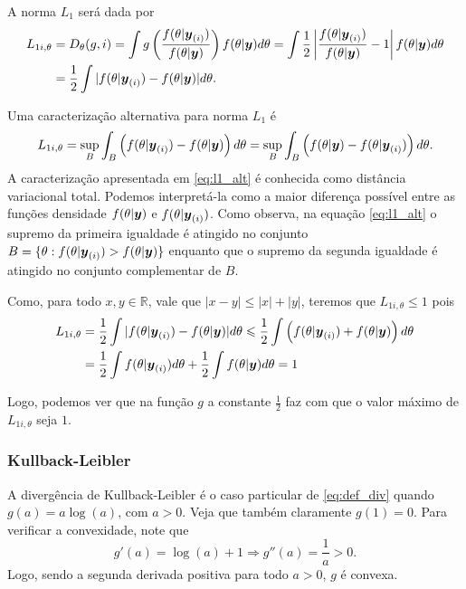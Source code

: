 A norma $L_1$ será dada por
\begin{equation}
\begin{split}
L_{1i,\theta} &= D_\theta(g,i)=\int g\left(\frac{f(\theta|{\boldsymbol{y}_{(i)}})}{f(\theta|{\boldsymbol{y}})}\right)f(\theta|{\boldsymbol{y}}) d\theta = \int \frac{1}{2}\left|\frac{f(\theta|{\boldsymbol{y}_{(i)}})}{f(\theta|{\boldsymbol{y}})}-1\right|f(\theta|{\boldsymbol{y}}) d\theta \\
{}& = \frac{1}{2} \int |f(\theta|{\boldsymbol{y}_{(i)}})-f(\theta|{\boldsymbol{y}})| d\theta.
\end{split}
\end{equation}

Uma caracterização alternativa para norma $L_1$ é
\begin{equation}\label{eq:l1_alt}
L_{1i,\theta} = \sup_B \int_B \left( f(\theta|{\boldsymbol{y}_{(i)}}) - f(\theta|{\boldsymbol{y}}) \right) d\theta = \sup_B \int_B \left( f(\theta|{\boldsymbol{y}}) - f(\theta|{\boldsymbol{y}_{(i)}}) \right) d\theta.
\end{equation}
A caracterização apresentada em \eqref{eq:l1_alt} é conhecida como distância variacional total. Podemos interpretá-la como a maior diferença possível entre as funções densidade $f(\theta|{\boldsymbol{y}})$ e $f(\theta|{\boldsymbol{y}_{(i)}})$. Como \citet{Weiss1996} observa, na equação \eqref{eq:l1_alt} o supremo da primeira igualdade é atingido no conjunto $B=\{\theta: f(\theta|{\boldsymbol{y}_{(i)}})>f(\theta|{\boldsymbol{y}})\}$ enquanto que o supremo da segunda igualdade é atingido no conjunto complementar de $B$.

Como, para todo $x,y\in \mathbb{R}$, vale que $|x-y|\leqslant |x|+|y|$, teremos que $L_{1i,\theta}\leqslant 1$ pois
\begin{equation}
\begin{split}
L_{1i,\theta} &= \frac{1}{2} \int |f(\theta|{\boldsymbol{y}_{(i)}})-f(\theta|{\boldsymbol{y}})| d\theta \leqslant \frac{1}{2} \int \left(f(\theta|{\boldsymbol{y}_{(i)}})+f(\theta|{\boldsymbol{y}})\right) d\theta \\
{}& = \frac{1}{2} \int f(\theta|{\boldsymbol{y}_{(i)}})d\theta + \frac{1}{2} \int f(\theta|{\boldsymbol{y}}) d\theta = 1
\end{split}
\end{equation}

Logo, podemos ver que na função $g$ a constante $\frac{1}{2}$ faz com que o valor máximo de $L_{1i,\theta}$ seja $1$.

\subsubsection{Kullback-Leibler}

A divergência de Kullback-Leibler é o caso particular de \eqref{eq:def_div} quando $g(a)=a\log(a)$, com $a>0$. Veja que também claramente $g(1)=0$. Para verificar a convexidade, note que
\begin{equation}
g'(a)=\log(a)+1 \Rightarrow g''(a)=\frac{1}{a} > 0.
\end{equation}
Logo, sendo a segunda derivada positiva para todo $a>0$, $g$ é convexa.

